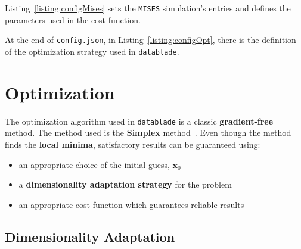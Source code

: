 Listing~\ref{listing:configMises} sets the \texttt{MISES} simulation's entries and defines the parameters used in the cost function.



At the end of \texttt{config.json}, in Listing~\ref{listing:configOpt}, there is the definition of the optimization strategy used in \texttt{datablade}.



\section{Optimization}

The optimization algorithm used in \texttt{datablade} is a classic \textbf{gradient-free} method. 
The method used is the \textbf{Simplex} method~\cite{nelder1965simplex}. 
Even though the method finds the \textbf{local minima}, satisfactory results can be guaranteed using:

\begin{itemize}
    \item an appropriate choice of the initial guess, $\boldsymbol{x}_0$ 
    \item a \textbf{dimensionality adaptation strategy} for the problem
    \item an appropriate cost function which guarantees reliable results
\end{itemize}

\subsection{Dimensionality Adaptation}


